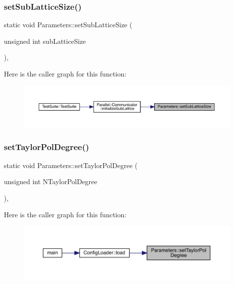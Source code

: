 \subsubsection{\texorpdfstring{setSubLatticeSize()}{setSubLatticeSize()}}
{\footnotesize\ttfamily static void Parameters\+::set\+Sub\+Lattice\+Size (\begin{DoxyParamCaption}\item[{unsigned int}]{sub\+Lattice\+Size }\end{DoxyParamCaption})\hspace{0.3cm}{\ttfamily [inline]}, {\ttfamily [static]}}

Here is the caller graph for this function\+:
\nopagebreak
\begin{figure}[H]
\begin{center}
\leavevmode
\includegraphics[width=350pt]{class_parameters_a978f5547036311816f21e3ebe8af77fc_icgraph}
\end{center}
\end{figure}
\mbox{\label{class_parameters_a68fb3eccef5dae481915be728ef61fb6}} 
\subsubsection{\texorpdfstring{setTaylorPolDegree()}{setTaylorPolDegree()}}
{\footnotesize\ttfamily static void Parameters\+::set\+Taylor\+Pol\+Degree (\begin{DoxyParamCaption}\item[{unsigned int}]{N\+Taylor\+Pol\+Degree }\end{DoxyParamCaption})\hspace{0.3cm}{\ttfamily [inline]}, {\ttfamily [static]}}

Here is the caller graph for this function\+:
\nopagebreak
\begin{figure}[H]
\begin{center}
\leavevmode
\includegraphics[width=350pt]{class_parameters_a68fb3eccef5dae481915be728ef61fb6_icgraph}
\end{center}
\end{figure}
\mbox{\label{class_parameters_a2d7077c967fffbdc6652559ec261b67c}} 

